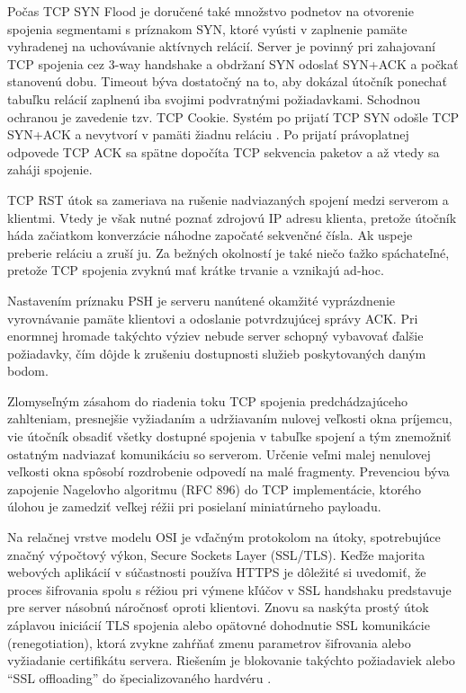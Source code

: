 \documentclass[12pt, a4paper]{article}
\begin{document}
Počas TCP SYN Flood je doručené také množstvo podnetov na otvorenie spojenia segmentami s príznakom SYN, 
ktoré vyústi v zaplnenie pamäte vyhradenej na uchovávanie aktívnych relácií. Server je povinný pri 
zahajovaní TCP spojenia cez 3-way handshake a obdržaní SYN odoslať SYN+ACK a počkať stanovenú dobu. Timeout 
býva dostatočný na to, aby dokázal útočník ponechať tabuľku relácií zaplnenú iba svojimi podvratnými 
požiadavkami. Schodnou ochranou je zavedenie tzv. TCP Cookie. Systém po prijatí TCP SYN odošle TCP SYN+ACK a 
nevytvorí v pamäti žiadnu reláciu \cite{csirt-ddos}. Po prijatí právoplatnej odpovede TCP ACK sa spätne 
dopočíta TCP sekvencia paketov a až vtedy sa zaháji spojenie. 

TCP RST útok sa zameriava na rušenie nadviazaných spojení medzi serverom a klientmi. Vtedy je však
nutné poznať zdrojovú IP adresu klienta, pretože útočník háda začiatkom konverzácie náhodne započaté 
sekvenčné čísla. Ak uspeje preberie reláciu a zruší ju. Za bežných okolností je také niečo ťažko 
spáchateľné, pretože TCP spojenia zvyknú mať krátke trvanie a vznikajú ad-hoc.

Nastavením príznaku PSH je serveru nanútené okamžité vyprázdnenie vyrovnávanie pamäte klientovi
a odoslanie potvrdzujúcej správy ACK. Pri enormnej hromade takýchto výziev nebude server schopný
vybavovať ďalšie požiadavky, čím dôjde k zrušeniu dostupnosti služieb poskytovaných
daným bodom.

Zlomyseľným zásahom do riadenia toku TCP spojenia predchádzajúceho zahlteniam, presnejšie vyžiadaním a 
udržiavaním nulovej veľkosti okna príjemcu, vie útočník obsadiť všetky dostupné spojenia v tabuľke
spojení a tým znemožniť ostatným nadviazať komunikáciu so serverom. Určenie veľmi malej nenulovej
veľkosti okna spôsobí rozdrobenie odpovedí na malé fragmenty. Prevenciou býva zapojenie Nagelovho
algoritmu (RFC 896) do TCP implementácie, ktorého úlohou je zamedziť veľkej réžii pri posielaní 
miniatúrneho payloadu.

Na relačnej vrstve modelu OSI je vďačným protokolom na útoky, spotrebujúce značný výpočtový výkon, Secure
Sockets Layer (SSL/TLS). Keďže majorita webových aplikácií v súčastnosti používa HTTPS
je dôležité si uvedomiť, že proces šifrovania spolu s réžiou pri výmene kľúčov v SSL handshaku predstavuje 
pre server násobnú náročnosť oproti klientovi. Znovu sa naskýta prostý útok záplavou iniciácií TLS spojenia
alebo opätovné dohodnutie SSL komunikácie (renegotiation), ktorá zvykne zahŕňať zmenu parametrov šifrovania
alebo vyžiadanie certifikátu servera. Riešením je blokovanie takýchto požiadaviek alebo \enquote{SSL 
offloading} do špecializovaného hardvéru \cite{csirt-ddos}.
\end{document}
